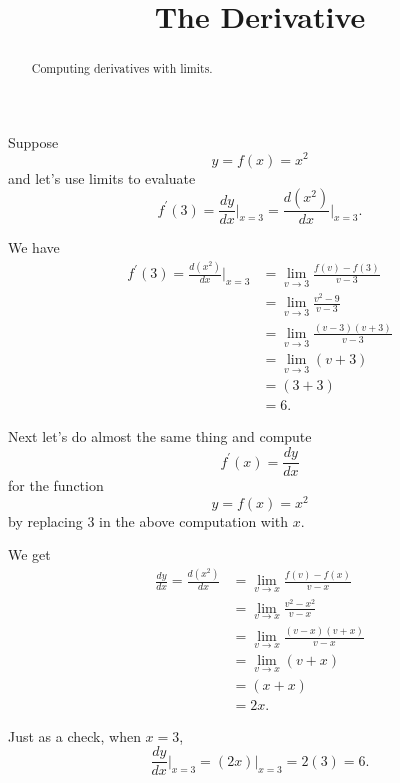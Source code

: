 \documentclass{ximera}
\title{The Derivative}
\begin{document}
\begin{abstract}
Computing derivatives with limits.
\end{abstract}
\maketitle
  


\begin{example}  \label{Ex:43tggt5t5}
Suppose 
\[
    y = f(x) = x^2
\]
and let's use limits to evaluate
\[
    f^\prime(3) =   \frac{dy}{dx}\Big|_{x=3} = \frac{d(x^2)}{dx}\Big|_{x=3} .
\]

We have
\begin{align*}
 f^\prime(3) = \frac{d(x^2)}{dx}\Big|_{x=3} &= \lim_{v\to 3} \frac{f(v)-f(3)}{v-3} \\
                                              &= \lim_{v\to 3} \frac{v^2 - 9}{v-3} \\
                                              &= \lim_{v\to 3} \frac{(v-3)(v+3)}{v-3} \\
                                             &= \lim_{v\to 3} (v+3) \\
                                           &= (3+3)  \\
                                           &= 6 .
\end{align*}

Next let's do almost the same thing and compute
\[
   f^\prime(x) =   \frac{dy}{dx}
\] 
for the function
\[
   y = f(x) = x^2 
\]
by replacing $3$ in the above computation with $x$. 

We get
\begin{align*}
 \frac{dy}{dx}= \frac{d(x^2)}{dx}&= \lim_{v\to x} \frac{f(v)-f(x)}{v-x} \\
                                              &= \lim_{v\to x} \frac{v^2 - x^2}{v-x} \\
                                              &= \lim_{v\to x} \frac{(v-x)(v+x)}{v-x} \\
                                             &= \lim_{v\to x} (v+x) \\
                                           &= (x+x)  \\
                                           &= 2x .
\end{align*}

Just as a check, when $x=3$,
\[
   \frac{dy}{dx}\Big|_{x=3} = (2x)\Big|_{x=3} = 2(3) = 6.
\]
\end{example}
\end{document}
